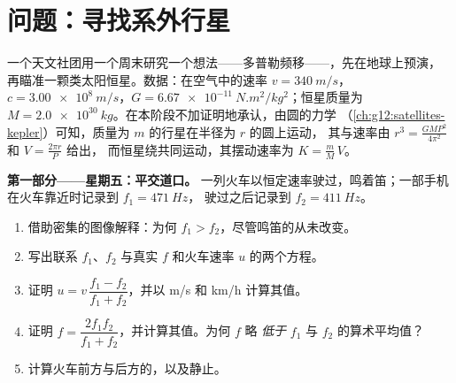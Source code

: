 \section{问题：寻找系外行星}

\begin{problem}
\label{pb:g12:doppler-effect:1}
一个天文社团用一个周末研究一个想法——多普勒频移——，先在地球上预演，
再瞄准一颗类太阳恒星。数据：在空气中的速率 $v = \qty{340}{m/s}$，
$c = \qty{3.00e8}{m/s}$，$G = \qty{6.67e-11}{N.m^2/kg^2}$；恒星质量为
$M = \qty{2.0e30}{kg}$。在本阶段不加证明地承认，由圆的力学
（\cref{ch:g12:satellites-kepler}）可知，质量为 $m$ 的行星在半径为 $r$ 的圆上运动，
其与速率由 $r^3 = \frac{G M P^2}{4\pi^2}$ 和 $V = \frac{2\pi r}{P}$ 给出，
而恒星绕共同运动，其摆动速率为 $K = \frac{m}{M}\,V$。

\medskip
\noindent\textbf{第一部分——星期五：平交道口。}
一列火车以恒定速率驶过，鸣着笛；一部手机在火车靠近时记录到 $f_1 = \qty{471}{Hz}$，
驶过之后记录到 $f_2 = \qty{411}{Hz}$。
\begin{enumerate}
  \item 借助密集的图像解释：为何 $f_1 > f_2$，尽管鸣笛的从未改变。
  \item 写出联系 $f_1$、$f_2$ 与真实 $f$ 和火车速率 $u$ 的两个方程。
  \item 证明 $u = v\,\dfrac{f_1 - f_2}{f_1 + f_2}$，并以 \unit{m/s} 和 \unit{km/h} 计算其值。
  \item 证明 $f = \dfrac{2 f_1 f_2}{f_1 + f_2}$，并计算其值。为何 $f$ 略
        \emph{低于} $f_1$ 与 $f_2$ 的算术平均值？
  \item 计算火车前方与后方的，以及静止。
\end{enumerate}


\end{problem}
